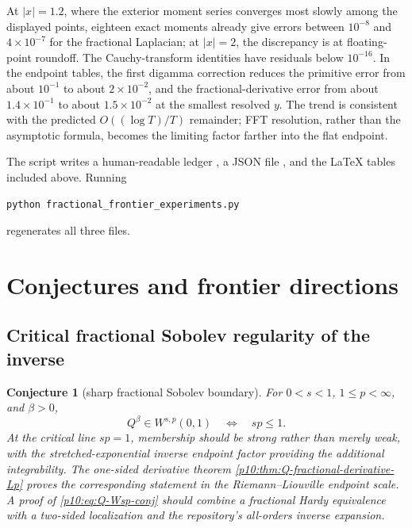\documentclass[11pt,oneside]{article}
\newtheorem{conjecture}[theorem]{Conjecture}
\theoremstyle{definition}
\theoremstyle{remark}
\newcommand{\Q}{Q}
\newcommand{\1}{\mathbf 1}
\begin{document}
\begingroup
\setlength{\tabcolsep}{5pt}

\endgroup

At \(|x|=1.2\), where the exterior moment series converges most slowly among the
displayed points, eighteen exact moments already give errors between
\(10^{-8}\) and \(4\times10^{-7}\) for the fractional Laplacian; at \(|x|=2\),
the discrepancy is at floating-point roundoff.  The Cauchy-transform identities have
residuals below \(10^{-16}\).  In the endpoint tables, the first digamma correction
reduces the primitive error from about \(10^{-1}\) to about \(2\times10^{-2}\), and
the fractional-derivative error from about \(1.4\times10^{-1}\) to about
\(1.5\times10^{-2}\) at the smallest resolved \(y\).  The trend is consistent with
the predicted \(O((\log T)/T)\) remainder; FFT resolution, rather than the asymptotic
formula, becomes the limiting factor farther into the flat endpoint.

The script writes a human-readable ledger , a JSON file
, and the LaTeX tables included above.  Running
\begin{verbatim}
python fractional_frontier_experiments.py
\end{verbatim}
regenerates all three files.


\section{Conjectures and frontier directions}

\subsection{Critical fractional Sobolev regularity of the inverse}

\begin{conjecture}[sharp fractional Sobolev boundary]\label{p10:conj:Q-Wsp}
For \(0<s<1\), \(1\le p<\infty\), and \(\beta>0\),
\begin{equation}\label{p10:eq:Q-Wsp-conj}
 \Q^\beta\in W^{s,p}(0,1)
 \quad\Longleftrightarrow\quad sp\le1.
\end{equation}
At the critical line \(sp=1\), membership should be strong rather than merely weak,
with the stretched-exponential inverse endpoint factor providing the additional
integrability.  The one-sided derivative theorem
\cref{p10:thm:Q-fractional-derivative-Lp} proves the corresponding statement in the
Riemann--Liouville endpoint scale.  A proof of \eqref{p10:eq:Q-Wsp-conj} should combine a
fractional Hardy equivalence with a two-sided localization and the repository's
all-orders inverse expansion.
\end{conjecture}
\end{document}
